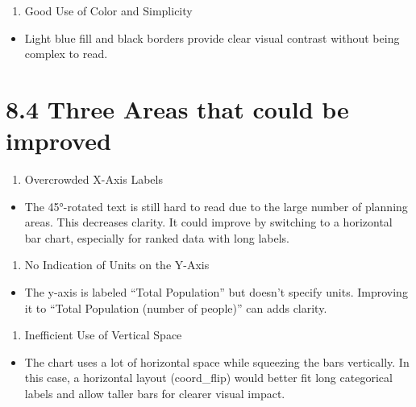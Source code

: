 \documentclass[
  letterpaper,
  DIV=11,
  numbers=noendperiod]{scrartcl}
\providecommand{\tightlist}{%
  \setlength{\itemsep}{0pt}\setlength{\parskip}{0pt}}\usepackage{longtable,booktabs,array}
\begin{document}
\begin{enumerate}
\def\labelenumi{\arabic{enumi}.}
\setcounter{enumi}{2}
\tightlist
\item
  Good Use of Color and Simplicity
\end{enumerate}

\begin{itemize}
\tightlist
\item
  Light blue fill and black borders provide clear visual contrast
  without being complex to read.
\end{itemize}

\section{8.4 Three Areas that could be
improved}\label{three-areas-that-could-be-improved}

\begin{enumerate}
\def\labelenumi{\arabic{enumi}.}
\tightlist
\item
  Overcrowded X-Axis Labels
\end{enumerate}

\begin{itemize}
\tightlist
\item
  The 45°-rotated text is still hard to read due to the large number of
  planning areas. This decreases clarity. It could improve by switching
  to a horizontal bar chart, especially for ranked data with long
  labels.
\end{itemize}

\begin{enumerate}
\def\labelenumi{\arabic{enumi}.}
\setcounter{enumi}{1}
\tightlist
\item
  No Indication of Units on the Y-Axis
\end{enumerate}

\begin{itemize}
\tightlist
\item
  The y-axis is labeled ``Total Population'' but doesn't specify units.
  Improving it to ``Total Population (number of people)'' can adds
  clarity.
\end{itemize}

\begin{enumerate}
\def\labelenumi{\arabic{enumi}.}
\setcounter{enumi}{2}
\tightlist
\item
  Inefficient Use of Vertical Space
\end{enumerate}

\begin{itemize}
\tightlist
\item
  The chart uses a lot of horizontal space while squeezing the bars
  vertically. In this case, a horizontal layout (coord\_flip) would
  better fit long categorical labels and allow taller bars for clearer
  visual impact.
\end{itemize}
\end{document}

